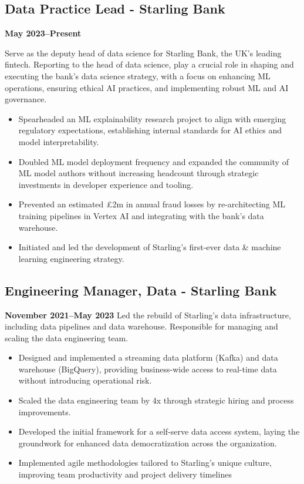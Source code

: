 \documentclass[a4paper]{scrartcl}
\begin{document}
\subsection*{Data Practice Lead - Starling Bank}
\textbf{May 2023--Present}

Serve as the deputy head of data science for Starling Bank, the UK's leading fintech. Reporting to the head of data science, play a crucial role in shaping and executing the bank's data science strategy, with a focus on enhancing ML operations, ensuring ethical AI practices, and implementing robust ML and AI governance.
\begin{itemize}
	\item Spearheaded an ML explainability research project to align with emerging regulatory expectations, establishing internal standards for AI ethics and model interpretability.
	\item Doubled ML model deployment frequency and expanded the community of ML model authors without increasing headcount through strategic investments in developer experience and tooling.
	\item Prevented an estimated £2m in annual fraud losses by re-architecting ML training pipelines in Vertex AI and integrating with the bank's data warehouse.
	\item Initiated and led the development of Starling's first-ever data & machine learning engineering strategy.
\end{itemize}

\subsection*{Engineering Manager, Data - Starling Bank}
\textbf{November 2021--May 2023}
Led the rebuild of Starling's data infrastructure, including data pipelines and data warehouse. Responsible for managing and scaling the data engineering team.
\begin{itemize}
	\item Designed and implemented a streaming data platform (Kafka) and data warehouse (BigQuery), providing business-wide access to real-time data without introducing operational risk.
	\item Scaled the data engineering team by 4x through strategic hiring and process improvements.
	\item Developed the initial framework for a self-serve data access system, laying the groundwork for enhanced data democratization across the organization.
	\item Implemented agile methodologies tailored to Starling's unique culture, improving team productivity and project delivery timelines
\end{itemize}
\end{document}
